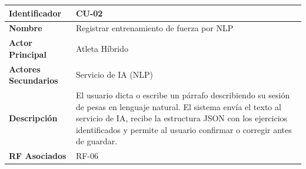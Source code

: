 \documentclass[12pt]{article}
\begin{document}
\begin{table}[h!]
    \centering
    \renewcommand{\arraystretch}{1.3}
    \begin{tabular}{|p{3.5cm}|p{11.5cm}|}
        \hline
        \rowcolor[HTML]{EFEFEF}
        \textbf{Identificador} & \textbf{CU-02} \\ \hline
        \textbf{Nombre} & Registrar entrenamiento de fuerza por NLP \\ \hline
        \textbf{Actor Principal} & Atleta Híbrido \\ \hline
        \textbf{Actores Secundarios} & Servicio de IA (NLP) \\ \hline
        \textbf{Descripción} & El usuario dicta o escribe un párrafo describiendo su sesión de pesas en lenguaje natural. El sistema envía el texto al servicio de IA, recibe la estructura JSON con los ejercicios identificados y permite al usuario confirmar o corregir antes de guardar. \\ \hline
        \textbf{RF Asociados} & RF-06 \\ \hline
    \end{tabular}
\end{table}
\end{document}
